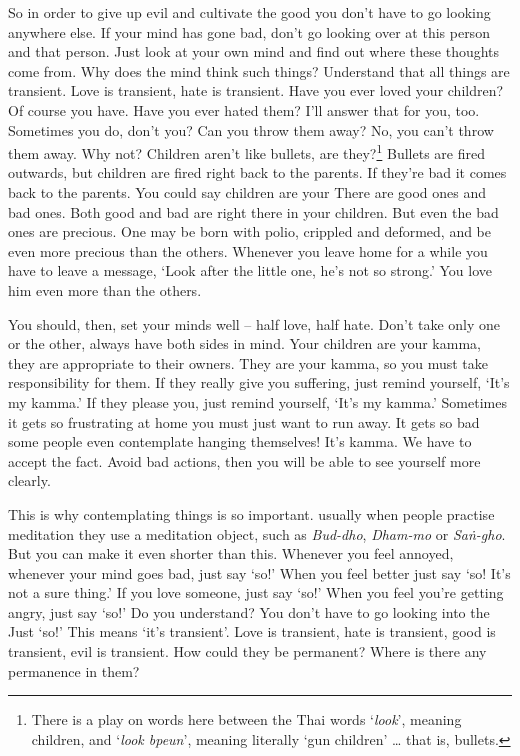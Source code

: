 So in order to give up evil and cultivate the good you don't have to go looking anywhere else. If your mind has gone bad, don't go looking over at this person and that person. Just look at your own mind and find out where these thoughts come from. Why does the mind think such things? Understand that all things are transient. Love is transient, hate is transient. Have you ever loved your children? Of course you have. Have you ever hated them? I'll answer that for you, too. Sometimes you do, don't you? Can you throw them away? No, you can't throw them away. Why not? Children aren't like bullets, are they?\footnote{There is a play on words here between the Thai words `\textit{look}', meaning children, and `\textit{look bpeun}', meaning literally `gun children' \ldots{} that is, bullets.} Bullets are fired outwards, but children are fired right back to the parents. If they're bad it comes back to the parents. You could say children are your  There are good ones and bad ones. Both good and bad are right there in your children. But even the bad ones are precious. One may be born with polio, crippled and deformed, and be even more precious than the others. Whenever you leave home for a while you have to leave a message, `Look after the little one, he's not so strong.' You love him even more than the others. 

You should, then, set your minds well -- half love, half hate. Don't take only one or the other, always have both sides in mind. Your children are your kamma, they are appropriate to their owners. They are your kamma, so you must take responsibility for them. If they really give you suffering, just remind yourself, `It's my kamma.' If they please you, just remind yourself, `It's my kamma.' Sometimes it gets so frustrating at home you must just want to run away. It gets so bad some people even contemplate hanging themselves! It's kamma. We have to accept the fact. Avoid bad actions, then you will be able to see yourself more clearly. 

This is why contemplating things is so important. usually when people practise meditation they use a meditation object, such as \textit{Bud-dho}, \textit{Dham-mo} or \textit{Sa\.n-gho}. But you can make it even shorter than this. Whenever you feel annoyed, whenever your mind goes bad, just say `so!' When you feel better just say `so! It's not a sure thing.' If you love someone, just say `so!' When you feel you're getting angry, just say `so!' Do you understand? You don't have to go looking into the  Just `so!' This means `it's transient'. Love is transient, hate is transient, good is transient, evil is transient. How could they be permanent? Where is there any permanence in them? 

